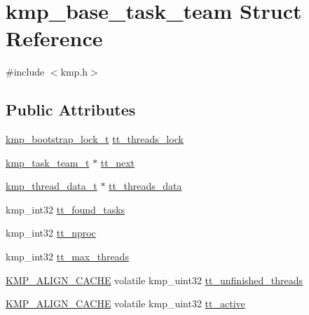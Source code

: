 \hypertarget{structkmp__base__task__team}{\section{kmp\-\_\-base\-\_\-task\-\_\-team Struct Reference}
\label{structkmp__base__task__team}
}


{\ttfamily \#include $<$kmp.\-h$>$}

\subsection*{Public Attributes}
\begin{DoxyCompactItemize}
\item 
\hyperlink{kmp__lock_8h_a480dc901a9c2be2a41f0ab8c381e94a7}{kmp\-\_\-bootstrap\-\_\-lock\-\_\-t} \hyperlink{structkmp__base__task__team_a2cb1e2598ab59f4d56f066d730ed98fe}{tt\-\_\-threads\-\_\-lock}
\item 
\hyperlink{kmp_8h_a1570ef2f4a50702c1be60039e4f5e605}{kmp\-\_\-task\-\_\-team\-\_\-t} $\ast$ \hyperlink{structkmp__base__task__team_aafdbe28350091816c93ae8fb66b6c421}{tt\-\_\-next}
\item 
\hyperlink{kmp_8h_a1341a4d3305053812a11b5219464d339}{kmp\-\_\-thread\-\_\-data\-\_\-t} $\ast$ \hyperlink{structkmp__base__task__team_a7433d86baf0395d71012878399e63bde}{tt\-\_\-threads\-\_\-data}
\item 
kmp\-\_\-int32 \hyperlink{structkmp__base__task__team_afb1c5ccacb58cdd0dd0895e4d535c120}{tt\-\_\-found\-\_\-tasks}
\item 
kmp\-\_\-int32 \hyperlink{structkmp__base__task__team_a0e3fe27829e52d0100074babe5f7ed2d}{tt\-\_\-nproc}
\item 
kmp\-\_\-int32 \hyperlink{structkmp__base__task__team_a0646ca6246f55d149ee022b5d9649a62}{tt\-\_\-max\-\_\-threads}
\item 
\hyperlink{kmp__os_8h_a6830c178a3906c25cd0138d8365db070}{K\-M\-P\-\_\-\-A\-L\-I\-G\-N\-\_\-\-C\-A\-C\-H\-E} volatile kmp\-\_\-uint32 \hyperlink{structkmp__base__task__team_a01de70849591effdf315bfc233c6ba1a}{tt\-\_\-unfinished\-\_\-threads}
\item 
\hyperlink{kmp__os_8h_a6830c178a3906c25cd0138d8365db070}{K\-M\-P\-\_\-\-A\-L\-I\-G\-N\-\_\-\-C\-A\-C\-H\-E} volatile kmp\-\_\-uint32 \hyperlink{structkmp__base__task__team_aa6e9a8311f759172e980d0f75bf81f7b}{tt\-\_\-active}
\end{DoxyCompactItemize}


